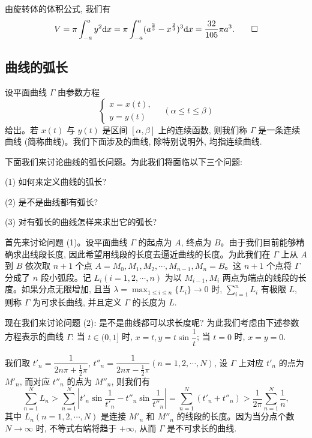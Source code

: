 \begin{solve}
由旋转体的体积公式, 我们有
\[
  V=\pi\int_{-a}^a y^2\mathrm dx
  =\pi\int_{-a}^a (a^{\frac23}-x^{\frac23})^3\mathrm dx
  =\frac{32}{105}\pi a^3.
\qedhere
\]
\end{solve}


\subsection{曲线的弧长}
\label{subsec:ma-7-6-6}

设平面曲线 $\Gamma$ 由参数方程
\[
  \begin{cases}
    x=x(t),\\
    y=y(t)
  \end{cases}
  \quad(\alpha\leq t\leq\beta)
\]
给出。若 $x(t)$ 与 $y(t)$ 是区间 $[\alpha,\beta]$ 上的连续函数, 则我们称 $\Gamma$ 是一条连续曲线 (简称曲线)。我们下面涉及的曲线, 除特别说明外, 均指连续曲线.

下面我们来讨论曲线的弧长问题。为此我们将面临以下三个问题:

(1) 如何来定义曲线的弧长?

(2) 是不是曲线都有弧长?

(3) 对有弧长的曲线怎样来求出它的弧长?

首先来讨论问题 (1)。设平面曲线 $\Gamma$ 的起点为 $A$, 终点为 $B$。由于我们目前能够精确求出线段长度, 因此希望用线段的长度去逼近曲线的长度。为此我们在 $\Gamma$ 上从 $A$ 到 $B$ 依次取 $n+1$ 个点 $A=M_0,M_1,M_2,\cdots,M_{n-1},M_n=B$。这 $n+1$ 个点将 $\Gamma$ 分成了 $n$ 段小弧段。记 $L_i(i=1,2,\cdots,n)$ 为以 $M_{i-1},M_i$ 两点为端点的线段的长度。如果分点无限增加, 且当 $\lambda=\max_{1\leq i\leq n}\{L_i\}\to0$ 时, $\sum_{i=1}^n L_i$ 有极限 $L$, 则称 $\Gamma$ 为可求长曲线, 并且定义 $\Gamma$ 的长度为 $L$.

现在我们来讨论问题 (2): 是不是曲线都可以求长度呢? 为此我们考虑由下述参数方程表示的曲线 $\Gamma$: 当 $t\in(0,1]$ 时, $x=t,y=t\sin\dfrac{1}{t}$; 当 $t=0$ 时, $x=y=0$.

我们取 $t'_n=\dfrac{1}{2n\pi+\frac12\pi}$, $t''_n=\dfrac{1}{2n\pi-\frac12\pi}(n=1,2,\cdots,N)$, 设 $\Gamma$ 上对应 $t'_n$ 的点为 $M'_n$, 而对应 $t''_n$ 的点为 $M''_n$, 则我们有
\[
  \sum_{n=1}^N L_n
  >\sum_{n=1}^N\left|t'_n\sin\frac{1}{t'_n}-t''_n\sin\frac{1}{t''_n}\right|
  =\sum_{n=1}^N(t'_n+t''_n)>\frac{1}{2\pi}\sum_{n=1}^N\frac{1}{n},
\]
其中 $L_n(n=1,2,\cdots,N)$ 是连接 $M'_n$ 和 $M''_n$ 的线段的长度。因为当分点个数 $N\to\infty$ 时, 不等式右端将趋于 $+\infty$, 从而 $\Gamma$ 是不可求长的曲线.

